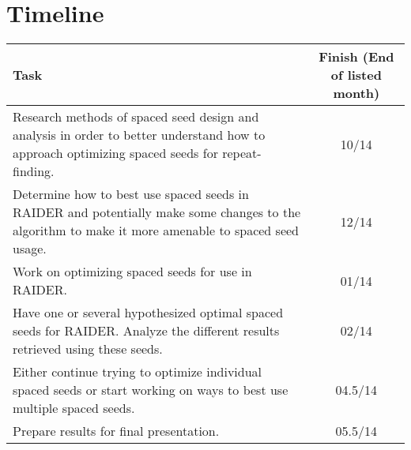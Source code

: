 \chapter{Timeline}
\label{timeline}
\begin{table}[H]
\centering \normalsize
\begin{tabular}{| m{9cm} |c|}
\hline
Task & Finish (End of listed month) \\ \hline 
Research methods of spaced seed design and analysis in order to better understand how to approach optimizing spaced seeds for repeat-finding. & 10/14 \\ \hline

Determine how to best use spaced seeds in RAIDER and potentially make some changes to the algorithm to make it more amenable to spaced seed usage. & 12/14 \\ \hline

Work on optimizing spaced seeds for use in RAIDER. & 01/14 \\ \hline

Have one or several hypothesized optimal spaced seeds for RAIDER. Analyze the different results retrieved using these seeds. & 02/14 \\ \hline

Either continue trying to optimize individual spaced seeds or start working on ways to best use multiple spaced seeds. & 04.5/14 \\ \hline

Prepare results for final presentation. & 05.5/14 \\
\hline
\end{tabular}


\end{table}
